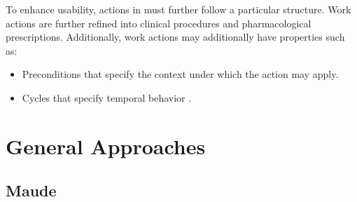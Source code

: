 To enhance usability, actions in \GLARE{} must further follow a particular
structure. Work actions are further refined into clinical procedures and
pharmacological prescriptions. Additionally, work actions may additionally
have properties such as:
\begin{itemize}
  \item Preconditions that specify the context under which the action may apply.
  \item Cycles that specify temporal behavior \cite{TerenzianiAIM01}.
\end{itemize}


\section{General Approaches}\label{sec:general-approaches}

\subsection{Maude}

